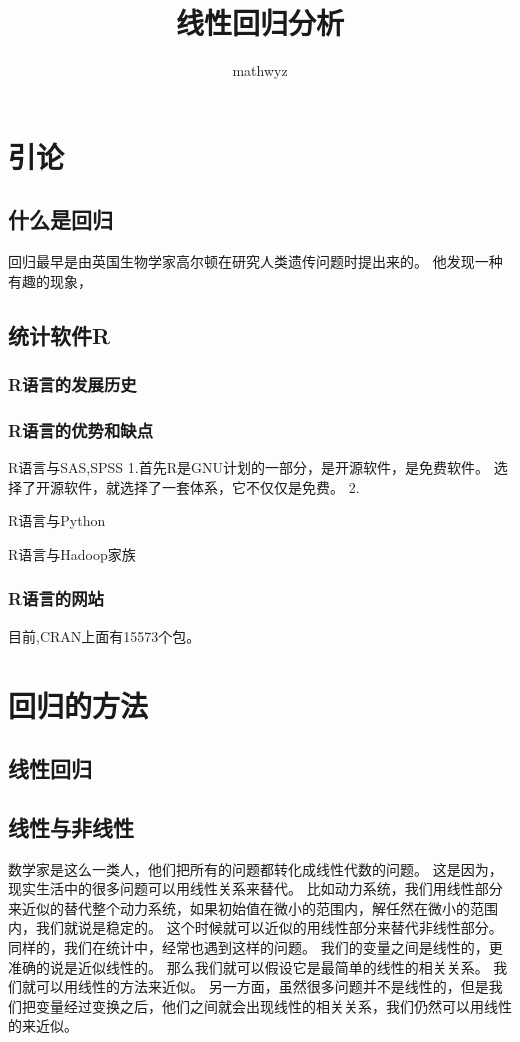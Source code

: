 \documentclass{amsart}
\title{线性回归分析}
\date{}
\author{mathwyz}
\begin{document}
\maketitle
\tableofcontents

\section{引论}

\subsection{什么是回归}
回归最早是由英国生物学家高尔顿在研究人类遗传问题时提出来的。
他发现一种有趣的现象，

\subsection{统计软件R}
\label{sec:02}

\subsubsection{R语言的发展历史}
\label{sec:0202}

\subsubsection{R语言的优势和缺点}
R语言与SAS,SPSS
1.首先R是GNU计划的一部分，是开源软件，是免费软件。
选择了开源软件，就选择了一套体系，它不仅仅是免费。
2.

R语言与Python

R语言与Hadoop家族
\subsubsection{R语言的网站}
\label{sec:0203}

目前,CRAN上面有15573个包。
\section{回归的方法}
\subsection{线性回归}
\subsection{线性与非线性}
数学家是这么一类人，他们把所有的问题都转化成线性代数的问题。
这是因为，现实生活中的很多问题可以用线性关系来替代。
比如动力系统，我们用线性部分来近似的替代整个动力系统，如果初始值在微小的范围内，解任然在微小的范围内，我们就说是稳定的。
这个时候就可以近似的用线性部分来替代非线性部分。
同样的，我们在统计中，经常也遇到这样的问题。
我们的变量之间是线性的，更准确的说是近似线性的。
那么我们就可以假设它是最简单的线性的相关关系。
我们就可以用线性的方法来近似。
另一方面，虽然很多问题并不是线性的，但是我们把变量经过变换之后，他们之间就会出现线性的相关关系，我们仍然可以用线性的来近似。
\end{document}

